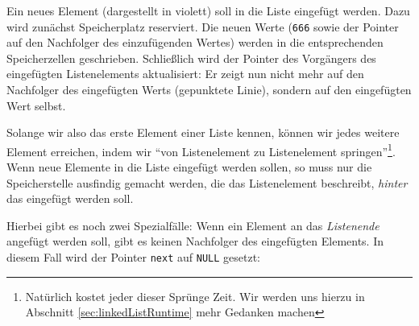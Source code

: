 \begin{tcolorbox}[title=Visualisierung: Einfügen in eine verkettete Liste]
Ein neues Element (dargestellt in violett) soll in die Liste eingefügt werden. Dazu wird zunächst Speicherplatz reserviert. Die neuen Werte (\texttt{666} sowie der Pointer auf den Nachfolger des einzufügenden Wertes) werden in die entsprechenden Speicherzellen geschrieben. Schließlich wird der Pointer des Vorgängers des eingefügten Listenelements aktualisiert: Er zeigt nun nicht mehr auf den Nachfolger des eingefügten Werts (gepunktete Linie), sondern auf den eingefügten Wert selbst.
\end{tcolorbox}

Solange wir also das erste Element einer Liste kennen, können wir jedes weitere Element erreichen, indem wir \enquote{von Listenelement zu Listenelement springen}\footnote{Natürlich kostet jeder dieser Sprünge Zeit. Wir werden uns hierzu in Abschnitt \ref{sec:linkedListRuntime} mehr Gedanken machen}. Wenn neue Elemente in die Liste eingefügt werden sollen, so muss nur die Speicherstelle ausfindig gemacht werden, die das Listenelement beschreibt, \emph{hinter} das eingefügt werden soll.

Hierbei gibt es noch zwei Spezialfälle: Wenn ein Element an das \emph{Listenende} angefügt werden soll, gibt es keinen Nachfolger des eingefügten Elements. In diesem Fall wird der Pointer \texttt{next} auf \texttt{NULL} gesetzt:

